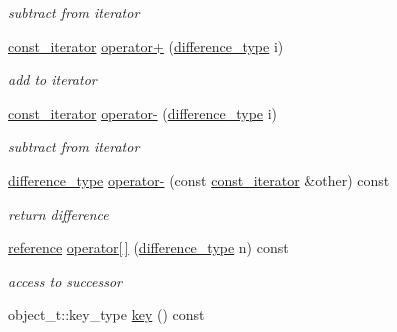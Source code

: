 \begin{DoxyCompactItemize}
\begin{DoxyCompactList}\small\item\em subtract from iterator \end{DoxyCompactList}\item 
\hyperlink{a00038}{const\+\_\+iterator} \hyperlink{a00038_a7a80257f2303210b0a5d056fc0b30b40}{operator+} (\hyperlink{a00038_a49d7c3e9ef3280df03052cce988b792f}{difference\+\_\+type} i)\hypertarget{a00038_a7a80257f2303210b0a5d056fc0b30b40}{}\label{a00038_a7a80257f2303210b0a5d056fc0b30b40}

\begin{DoxyCompactList}\small\item\em add to iterator \end{DoxyCompactList}\item 
\hyperlink{a00038}{const\+\_\+iterator} \hyperlink{a00038_abc4552ba2fe39e7901a83dd6d4dec151}{operator-\/} (\hyperlink{a00038_a49d7c3e9ef3280df03052cce988b792f}{difference\+\_\+type} i)\hypertarget{a00038_abc4552ba2fe39e7901a83dd6d4dec151}{}\label{a00038_abc4552ba2fe39e7901a83dd6d4dec151}

\begin{DoxyCompactList}\small\item\em subtract from iterator \end{DoxyCompactList}\item 
\hyperlink{a00038_a49d7c3e9ef3280df03052cce988b792f}{difference\+\_\+type} \hyperlink{a00038_a5e4d98a8f95e2eccde8cd48c19efa196}{operator-\/} (const \hyperlink{a00038}{const\+\_\+iterator} \&other) const \hypertarget{a00038_a5e4d98a8f95e2eccde8cd48c19efa196}{}\label{a00038_a5e4d98a8f95e2eccde8cd48c19efa196}

\begin{DoxyCompactList}\small\item\em return difference \end{DoxyCompactList}\item 
\hyperlink{a00038_aefd248cac6493eed1e6ff53ba6a63eb2}{reference} \hyperlink{a00038_a7bd530bfbbc58ac77308c087120c21fa}{operator\mbox{[}$\,$\mbox{]}} (\hyperlink{a00038_a49d7c3e9ef3280df03052cce988b792f}{difference\+\_\+type} n) const \hypertarget{a00038_a7bd530bfbbc58ac77308c087120c21fa}{}\label{a00038_a7bd530bfbbc58ac77308c087120c21fa}

\begin{DoxyCompactList}\small\item\em access to successor \end{DoxyCompactList}\item 
object\+\_\+t\+::key\+\_\+type \hyperlink{a00038_a5d4320e24fcb7df041ff2c95d976dba0}{key} () const \hypertarget{a00038_a5d4320e24fcb7df041ff2c95d976dba0}{}\label{a00038_a5d4320e24fcb7df041ff2c95d976dba0}


\end{DoxyCompactItemize}
